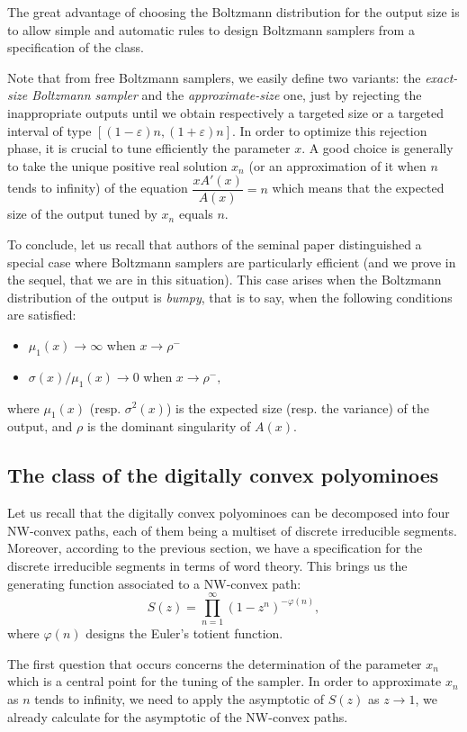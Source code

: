 \documentclass{article}
\def\eps{\varepsilon}
\begin{document}
The great advantage of choosing the Boltzmann distribution for the
output size is to allow simple and automatic rules to design Boltzmann
samplers from a specification of the class. 


Note that from free Boltzmann samplers, we easily define two
variants: the \emph{exact-size Boltzmann sampler} and the
\emph{approximate-size} one, just by rejecting the inappropriate
outputs until we obtain respectively a targeted size or a targeted
interval of type $[(1-\eps ) n,(1+\eps ) n]$. In order to optimize
this rejection phase, it is crucial to tune efficiently the
parameter $x$. A good choice is generally to take the unique
positive real solution $x_n$ (or an approximation of it when $n$
tends to infinity) of the equation $\dfrac{xA'(x)}{A(x)}=n$ which
means that the expected size of the output tuned by $x_n$
equals $n$.

To conclude, let us recall that authors of the seminal paper \cite{DuFlLoSc04}
distinguished a special case where Boltzmann samplers are particularly
efficient (and we prove in the sequel, that we are in this
situation). This case arises when the Boltzmann distribution of the
output is \emph{bumpy}, that is to say, when the following conditions
are satisfied:
\vspace{-0.3cm}
\begin{itemize}
\item $\mu_1(x) \rightarrow \infty$ when $x \rightarrow \rho^{-}$
\item $\sigma(x)/\mu_1(x) \rightarrow 0$ when $x \rightarrow \rho^{-},$
\end{itemize}
where $\mu_1(x)$ (resp.  $\sigma^2(x)$) is the expected size (resp. the variance) of the output, and $\rho$ is the dominant singularity of $A(x)$.
\subsection{The class of the digitally convex polyominoes}
Let us recall that the digitally convex polyominoes can be
decomposed into four NW-convex paths, each of them being a multiset of
discrete irreducible segments. Moreover, according to the previous
section, we have a specification for the discrete irreducible
segments in terms of word theory. This brings us the generating
function associated to a NW-convex path:
\[S(z)=\prod\limits_{n=1}^{\infty} (1-z^{n})^{-\varphi(n)},\]
where $\varphi(n)$ designs the Euler's totient function.

The first question that occurs concerns the determination of the
parameter $x_n$ which is a central point for the tuning of the
sampler. In order to approximate $x_n$ as $n$ tends to infinity,
we need to apply the asymptotic of $S(z)$ as $z \rightarrow 1$, we already calculate for the asymptotic of the NW-convex paths.
\end{document}
